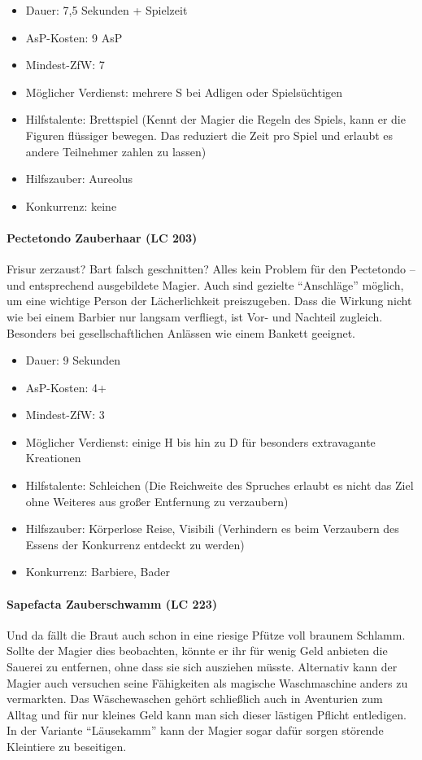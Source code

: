 \begin{itemize}
	\item Dauer: 7,5 Sekunden + Spielzeit
	\item AsP-Kosten: 9 AsP
	\item Mindest-ZfW: 7
	\item Möglicher Verdienst: mehrere S bei Adligen oder Spielsüchtigen
	\item Hilfstalente: Brettspiel (Kennt der Magier die Regeln des Spiels, kann er die Figuren flüssiger bewegen. Das reduziert die Zeit pro Spiel und erlaubt es andere Teilnehmer zahlen zu lassen)
	\item Hilfszauber: Aureolus
	\item Konkurrenz: keine
\end{itemize}

\paragraph{Pectetondo Zauberhaar (LC 203)}
Frisur zerzaust? Bart falsch geschnitten? Alles kein Problem für den Pectetondo -- und entsprechend ausgebildete Magier. Auch sind gezielte \enquote{Anschläge} möglich, um eine wichtige Person der Lächerlichkeit preiszugeben. Dass die Wirkung nicht wie bei einem Barbier nur langsam verfliegt, ist Vor- und Nachteil zugleich. Besonders bei gesellschaftlichen Anlässen wie einem Bankett geeignet.

\begin{itemize}
	\item Dauer: 9 Sekunden
	\item AsP-Kosten: 4+
	\item Mindest-ZfW: 3
	\item Möglicher Verdienst: einige H bis hin zu D für besonders extravagante Kreationen
	\item Hilfstalente: Schleichen (Die Reichweite des Spruches erlaubt es nicht das Ziel ohne Weiteres aus großer Entfernung zu verzaubern)
	\item Hilfszauber: Körperlose Reise, Visibili (Verhindern es beim Verzaubern des Essens der Konkurrenz entdeckt zu werden)
	\item Konkurrenz: Barbiere, Bader
\end{itemize}

\paragraph{Sapefacta Zauberschwamm (LC 223)}
Und da fällt die Braut auch schon in eine riesige Pfütze voll braunem Schlamm. Sollte der Magier dies beobachten, könnte er ihr für wenig Geld anbieten die Sauerei zu entfernen, ohne dass sie sich ausziehen müsste. Alternativ kann der Magier auch versuchen seine Fähigkeiten als magische Waschmaschine anders zu vermarkten. Das Wäschewaschen gehört schließlich auch in Aventurien zum Alltag und für nur kleines Geld kann man sich dieser lästigen Pflicht entledigen. In der Variante \enquote{Läusekamm} kann der Magier sogar dafür sorgen störende Kleintiere zu beseitigen.

